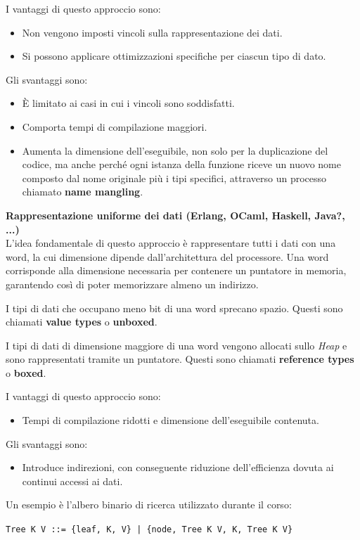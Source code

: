 \documentclass{article}
\begin{document}
I vantaggi di questo approccio sono:
\begin{itemize}
    \item Non vengono imposti vincoli sulla rappresentazione dei dati.
    \item Si possono applicare ottimizzazioni specifiche per ciascun tipo di dato.
\end{itemize}

Gli svantaggi sono:
\begin{itemize}
    \item È limitato ai casi in cui i vincoli sono soddisfatti.
    \item Comporta tempi di compilazione maggiori.
    \item Aumenta la dimensione dell'eseguibile, non solo per la duplicazione del codice, ma anche perché ogni istanza della funzione riceve un nuovo nome composto dal nome originale più i tipi specifici, attraverso un processo chiamato \textbf{name mangling}.\\
\end{itemize}

\textbf{Rappresentazione uniforme dei dati (Erlang, OCaml, Haskell, Java?, ...)}\\
L'idea fondamentale di questo approccio è rappresentare tutti i dati con una word, la cui dimensione dipende dall'architettura del processore. Una word corrisponde alla dimensione necessaria per contenere un puntatore in memoria, garantendo così di poter memorizzare almeno un indirizzo.

I tipi di dati che occupano meno bit di una word sprecano spazio. Questi sono chiamati \textbf{value types} o \textbf{unboxed}.

I tipi di dati di dimensione maggiore di una word vengono allocati sullo \textit{Heap} e sono rappresentati tramite un puntatore. Questi sono chiamati \textbf{reference types} o \textbf{boxed}.

I vantaggi di questo approccio sono:
\begin{itemize}
    \item Tempi di compilazione ridotti e dimensione dell'eseguibile contenuta.
\end{itemize}

Gli svantaggi sono:
\begin{itemize}
    \item Introduce indirezioni, con conseguente riduzione dell'efficienza dovuta ai continui accessi ai dati.\\
\end{itemize}
Un esempio è l'albero binario di ricerca utilizzato durante il corso:
\begin{center}
    \texttt{Tree K V ::= \{leaf, K, V\} | \{node, Tree K V, K, Tree K V\}}    
\end{center}
\end{document}
